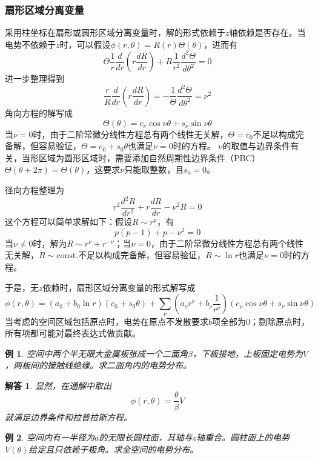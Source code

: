 \documentclass[a4paper,11pt]{ctexart}
\newtheorem{eg}{例}[section]
\newtheorem{ans}{解答}[section]
\newcommand{\beq}{\begin{equation}}
\newcommand{\eeq}{\end{equation}}
\begin{document}
\subsubsection{扇形区域分离变量}
采用柱坐标在扇形或圆形区域分离变量时，解的形式依赖于$z$轴依赖是否存在。当电势不依赖于$z$时，可以假设$\phi(r,\theta) = R(r) \Theta(\theta)$，进而有
\beq
\Theta \frac{1}{r} \frac{d}{dr} \left( r \frac{dR}{dr}\right) + R \frac{1}{r^2} \frac{d^2 \Theta}{d \theta^2} = 0
\eeq
进一步整理得到
\beq
\frac{r}{R} \frac{d}{dr} \left( r \frac{dR}{dr} \right) = - \frac{1}{\Theta} \frac{d^2 \Theta}{d \theta^2} = \nu^2
\eeq
角向方程的解写成
\beq
\Theta(\theta) = c_\nu \cos \nu \theta + s_\nu \sin \nu \theta
\eeq
当$\nu=0$时，由于二阶常微分线性方程总有两个线性无关解，$\Theta = c_0$不足以构成完备解，但容易验证，$\Theta = c_0 + s_0 \theta$也满足$\nu=0$时的方程。
$\nu$的取值与边界条件有关，当形区域为圆形区域时，需要添加自然周期性边界条件（PBC）$\Theta(\theta + 2\pi) = \Theta(\theta)$，这要求$\nu$只能取整数，且$s_0=0$。
\par
径向方程整理为
\beq
r^2 \frac{d^2 R}{dr^2} + r \frac{dR}{dr} - \nu^2 R = 0
\eeq
这个方程可以简单求解如下：假设$R \sim r^p$，有
\beq
p(p-1) + p - \nu^2 = 0
\eeq
当$\nu \not= 0$时，解为$R \sim r^\nu + r^{-\nu}$；当$\nu=0$，由于二阶常微分线性方程总有两个线性无关解，$R \sim \mathrm{const.}$不足以构成完备解，但容易验证，$R \sim \ln r$也满足$\nu=0$时的方程。
\par
于是，无$z$依赖时，扇形区域分离变量的形式解写成
\beq
\phi(r,\theta) = (a_0 + b_0 \ln r)(c_0 + s_0 \theta) + \sum_{\nu} \left(a_\nu r^\nu + b_\nu \frac{1}{r^\nu} \right) \left( c_\nu \cos \nu \theta + s_\nu \sin \nu \theta \right)
\eeq
当考虑的空间区域包括原点时，电势在原点不发散要求$b$项全部为0；剔除原点时，所有项都可能对最终表达式做贡献。
\begin{eg}
空间中两个半无限大金属板张成一个二面角$\beta$，下板接地，上板固定电势为$V$，两板间的接触线绝缘。求二面角内的电势分布。
\end{eg}
\begin{ans}
显然，在通解中取出
\beq
\phi(r,\theta) = \frac{\theta}{\beta} V
\eeq
就满足边界条件和拉普拉斯方程。
\end{ans}
\begin{eg}
空间内有一半径为$a$的无限长圆柱面，其轴与$z$轴重合。圆柱面上的电势$V(\theta)$给定且只依赖于极角。求全空间的电势分布。
\end{eg}
\end{document}
